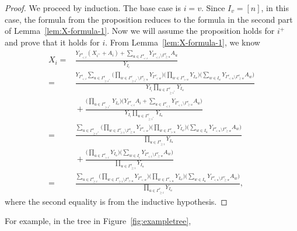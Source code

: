 \documentclass[10pt,a4paper]{amsart}
\numberwithin{equation}{section}
\begin{document}
\begin{proof}
We proceed by induction. The base case is $i=v$. Since $I_v=[n]$, in this case, the formula from the proposition reduces to the formula in the second part of Lemma~\ref{lem:X-formula-1}.
Now we will assume the proposition holds for $i^+$ and prove that it holds for $i$. From Lemma~\ref{lem:X-formula-1}, we know
\begin{align*}
X_i={} & \frac{Y_{\Gamma_{< i}^v}(X_{i^+}+A_i)+\sum_{u\in \Gamma_{< i}^v}Y_{\Gamma_{< i}^v\setminus\Gamma_{\geq u}^v}A_u}{Y_{I_i}}\\
={} & \frac{Y_{\Gamma_{< i}^v}\sum_{u\in\Gamma_{\geq i^+}^v}\Big(\prod_{w\in\Gamma_{\geq i^+}^v\setminus\Gamma_{\geq u}^v} Y_{\Gamma_{< w}^v}\Big)\Big(\prod_{w\in\Gamma_{> u}^v} Y_{I_w}\Big)\Big(\sum_{w\in I_u}Y_{\Gamma_{< u}^v\setminus\Gamma_{\geq w}^v}A_w\Big)}{Y_{I_i}\prod_{u\in\Gamma_{\geq i^+}^v}Y_{I_u}} \\
&{}+ \frac{\Big(\prod_{u\in\Gamma_{\geq i^+}^v}Y_{I_u}\Big)\Big(Y_{\Gamma_{< i}^v}A_i+\sum_{u\in \Gamma_{< i}^v}Y_{\Gamma_{< i}^v\setminus\Gamma_{\geq u}^v}A_u\Big)}{Y_{I_i}\prod_{u\in\Gamma_{\geq i^+}^v}Y_{I_u}}\\
={} & \frac{\sum_{u\in\Gamma_{\geq i^+}^v}\Big(\prod_{w\in\Gamma_{\geq i}^v\setminus\Gamma_{\geq u}^v} Y_{\Gamma_{< w}^v}\Big)\Big(\prod_{w\in\Gamma_{> u}^v} Y_{I_w}\Big)\Big(\sum_{w\in I_u}Y_{\Gamma_{< u}^v\setminus\Gamma_{\geq w}^v}A_w\Big)}{\prod_{u\in\Gamma_{\geq i}^v}Y_{I_u}} \\
&{}+ \frac{\Big(\prod_{u\in\Gamma_{> i}^v}Y_{I_u}\Big)\Big(\sum_{w\in I_i}Y_{\Gamma_{< i}^v\setminus\Gamma_{\geq w}^v}A_w\Big)}{\prod_{u\in\Gamma_{\geq i}^v}Y_{I_u}}\\
={} & \frac{\sum_{u\in\Gamma_{\geq i}^v}\Big(\prod_{w\in\Gamma_{\geq i}^v\setminus\Gamma_{\geq u}^v} Y_{\Gamma_{< w}^v}\Big)\Big(\prod_{w\in\Gamma_{> u}^v} Y_{I_w}\Big)\Big(\sum_{w\in I_u}Y_{\Gamma_{< u}^v\setminus\Gamma_{\geq w}^v}A_w\Big)}{\prod_{u\in\Gamma_{\geq i}^v}Y_{I_u}},
\end{align*}
where the second equality is from the inductive hypothesis.
\end{proof}
For example, in the tree in Figure~\ref{fig:exampletree},
\end{document}
